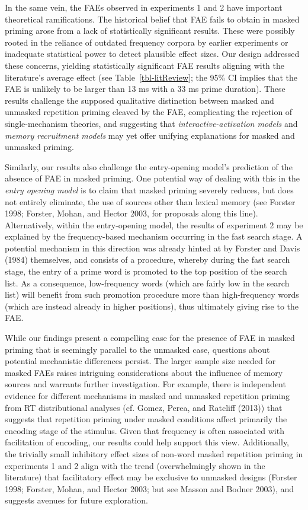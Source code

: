 \documentclass[
]{interact}
\begin{document}
In the same vein, the FAEs observed in experiments 1 and 2 have
important theoretical ramifications. The historical belief that FAE
fails to obtain in masked priming arose from a lack of statistically
significant results. These were possibly rooted in the reliance of
outdated frequency corpora by earlier experiments or inadequate
statistical power to detect plausible effect sizes. Our design addressed
these concerns, yielding statistically significant FAE results aligning
with the literature's average effect (see Table~\ref{tbl-litReview}; the
95\% CI implies that the FAE is unlikely to be larger than 13 ms with a
33 ms prime duration). These results challenge the supposed qualitative
distinction between masked and unmasked repetition priming cleaved by
the FAE, complicating the rejection of single-mechanism theories, and
suggesting that \emph{interactive-activation models} and \emph{memory
recruitment models} may yet offer unifying explanations for masked and
unmasked priming.

Similarly, our results also challenge the entry-opening model's
prediction of the absence of FAE in masked priming. One potential way of
dealing with this in the \emph{entry opening model} is to claim that
masked priming severely reduces, but does not entirely eliminate, the
use of sources other than lexical memory (see Forster 1998; Forster,
Mohan, and Hector 2003, for proposals along this line). Alternatively,
within the entry-opening model, the results of experiment 2 may be
explained by the frequency-based mechanism occurring in the fast search
stage. A potential mechanism in this direction was already hinted at by
Forster and Davis (1984) themselves, and consists of a procedure,
whereby during the fast search stage, the entry of a prime word is
promoted to the top position of the search list. As a consequence,
low-frequency words (which are fairly low in the search list) will
benefit from such promotion procedure more than high-frequency words
(which are instead already in higher positions), thus ultimately giving
rise to the FAE.

While our findings present a compelling case for the presence of FAE in
masked priming that is seemingly parallel to the unmasked case,
questions about potential mechanistic differences persist. The larger
sample size needed for masked FAEs raises intriguing considerations
about the influence of memory sources and warrants further
investigation. For example, there is independent evidence for different
mechanisms in masked and unmasked repetition priming from RT
distributional analyses (cf. Gomez, Perea, and Ratcliff (2013)) that
suggests that repetition priming under masked conditions affect
primarily the encoding stage of the stimulus. Given that frequency is
often associated with facilitation of encoding, our results could help
support this view. Additionally, the trivially small inhibitory effect
sizes of non-word masked repetition priming in experiments 1 and 2 align
with the trend (overwhelmingly shown in the literature) that
facilitatory effect may be exclusive to unmasked designs (Forster 1998;
Forster, Mohan, and Hector 2003; but see Masson and Bodner 2003), and
suggests avenues for future exploration.
\end{document}
